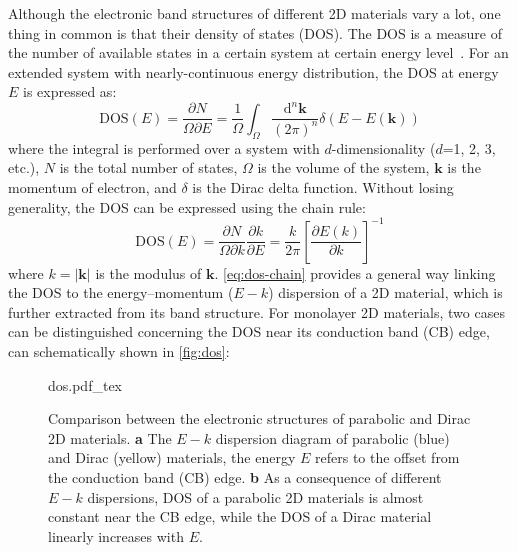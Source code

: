 Although the electronic band structures of different 2D materials vary
a lot, one thing in common is that their density of states (DOS). The
DOS is a measure of the number of available states in a certain system
at certain energy level~\cite{kittel_2005_introduction}. For an
extended system with nearly-continuous energy distribution, the DOS at
energy $E$ is expressed as\cite{kittel_2005_introduction}:
\begin{equation}
  \label{eq:ch-intro-dos}
  \mathrm{DOS}(E) = \frac{\partial N}{\Omega \partial E} =  \frac{1}{\Omega} {\displaystyle \int_{\Omega}} \frac{\mathrm{d}^{n} \mathbf{k}}{(2 \pi)^{n}}
  \delta(E - E(\mathbf{k}))
\end{equation}
where the integral is performed over a system with $d$-dimensionality
($d$=1, 2, 3, etc.), $N$ is the total number of states, $\Omega$ is
the volume of the system, $\mathbf{k}$ is the momentum of electron,
and $\delta$ is the Dirac delta function. Without losing generality,
the DOS can be expressed using the chain rule:
\begin{equation}
  \label{eq:dos-chain}
  \mathrm{DOS}(E) = \frac{\partial N}{\Omega \partial k} \frac{\partial k}{\partial E}
               = \frac{k}{2 \pi} \left[\frac{\partial E(k)}{\partial k}\right]^{-1}
\end{equation}
where $k=|\mathbf{k}|$ is the modulus of $\mathbf{k}$.
%
\autoref{eq:dos-chain} provides a general way linking the DOS to the
energy--momentum ($E-k$) dispersion of a 2D material, which is further
extracted from its band structure. For monolayer 2D materials, two
cases can be distinguished concerning the DOS near its conduction band
(CB) edge, can schematically shown in \autoref{fig:dos}:
\begin{figure}[h]
  \centering
  {dos.pdf_tex}
  \caption{\label{fig:dos}%
    Comparison between the electronic structures of parabolic and
    Dirac 2D materials. \textbf{a} The $E-k$ dispersion diagram of
    parabolic (blue) and Dirac (yellow) materials, the energy $E$
    refers to the offset from the conduction band (CB) edge.
    \textbf{b} As a consequence of different $E-k$ dispersions, DOS of
    a parabolic 2D materials is almost constant near the CB edge,
    while the DOS of a Dirac material linearly increases with $E$.  %
  }
\end{figure}

